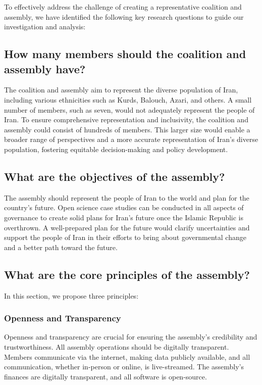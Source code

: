 \documentclass{IEEEtran}
\begin{document}
To effectively address the challenge of creating a representative coalition and assembly, we have identified the following key research questions to guide our investigation and analysis:

\subsection{How many members should the coalition and assembly have?}
The coalition and assembly aim to represent the diverse population of Iran, including various ethnicities such as Kurds, Balouch, Azari, and others. A small number of members, such as seven, would not adequately represent the people of Iran. To ensure comprehensive representation and inclusivity, the coalition and assembly could consist of hundreds of members. This larger size would enable a broader range of perspectives and a more accurate representation of Iran's diverse population, fostering equitable decision-making and policy development.

\subsection{What are the objectives of the assembly?}
The assembly should represent the people of Iran to the world and plan for the country's future. Open science case studies can be conducted in all aspects of governance to create solid plans for Iran's future once the Islamic Republic is overthrown. A well-prepared plan for the future would clarify uncertainties and support the people of Iran in their efforts to bring about governmental change and a better path toward the future.

\subsection{What are the core principles of the assembly?}
In this section, we propose three principles:

\subsubsection{Openness and Transparency}
Openness and transparency are crucial for ensuring the assembly's credibility and trustworthiness. All assembly operations should be digitally transparent. Members communicate via the internet, making data publicly available, and all communication, whether in-person or online, is live-streamed. The assembly's finances are digitally transparent, and all software is open-source.
\end{document}
